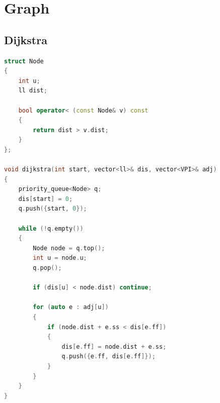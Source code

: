 \chapter{Graph}

\section{Dijkstra}
\begin{lstlisting}[language=C++]
struct Node
{
    int u;
    ll dist;

    bool operator< (const Node& v) const
    {
        return dist > v.dist;
    }
};

void dijkstra(int start, vector<ll>& dis, vector<VPI>& adj)
{
    priority_queue<Node> q;
    dis[start] = 0;
    q.push({start, 0});

    while (!q.empty())
    {
        Node node = q.top();
        int u = node.u;
        q.pop();

        if (dis[u] < node.dist) continue;

        for (auto e : adj[u])
        {
            if (node.dist + e.ss < dis[e.ff])
            {
                dis[e.ff] = node.dist + e.ss;
                q.push({e.ff, dis[e.ff]});
            }
        }
    }
}
\end{lstlisting}
\sectionend

